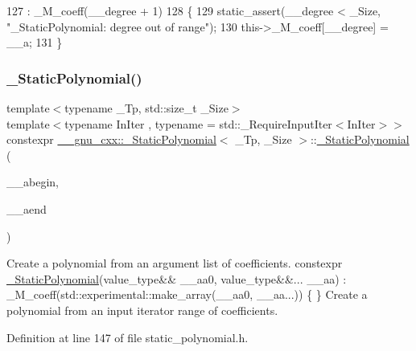 \begin{DoxyCode}
127       : \_M\_coeff(\_\_degree + 1)
128       \{
129         static\_assert(\_\_degree < \_Size, \textcolor{stringliteral}{"\_StaticPolynomial: degree out of range"});
130         this->\_M\_coeff[\_\_degree] = \_\_a;
131       \}
\end{DoxyCode}
\mbox{\label{class____gnu__cxx_1_1__StaticPolynomial_a584243df0cb49a1a9f114180bbb499e2}} 
\subsubsection{\texorpdfstring{\+\_\+\+Static\+Polynomial()}{\_StaticPolynomial()}\hspace{0.1cm}{\footnotesize\ttfamily [8/8]}}
{\footnotesize\ttfamily template$<$typename \+\_\+\+Tp, std\+::size\+\_\+t \+\_\+\+Size$>$ \\
template$<$typename In\+Iter , typename  = std\+::\+\_\+\+Require\+Input\+Iter$<$\+In\+Iter$>$$>$ \\
constexpr \hyperlink{class____gnu__cxx_1_1__StaticPolynomial}{\+\_\+\+\_\+gnu\+\_\+cxx\+::\+\_\+\+Static\+Polynomial}$<$ \+\_\+\+Tp, \+\_\+\+Size $>$\+::\hyperlink{class____gnu__cxx_1_1__StaticPolynomial}{\+\_\+\+Static\+Polynomial} (\begin{DoxyParamCaption}\item[{const In\+Iter \&}]{\+\_\+\+\_\+abegin,  }\item[{const In\+Iter \&}]{\+\_\+\+\_\+aend }\end{DoxyParamCaption})\hspace{0.3cm}{\ttfamily [inline]}}

Create a polynomial from an argument list of coefficients. constexpr \hyperlink{class____gnu__cxx_1_1__StaticPolynomial}{\+\_\+\+Static\+Polynomial}(value\+\_\+type\&\& \+\_\+\+\_\+aa0, value\+\_\+type\&\&... \+\_\+\+\_\+aa) \+: \+\_\+\+M\+\_\+coeff(std\+::experimental\+::make\+\_\+array(\+\_\+\+\_\+aa0, \+\_\+\+\_\+aa...)) \{ \} Create a polynomial from an input iterator range of coefficients. 

Definition at line 147 of file static\+\_\+polynomial.\+h.


